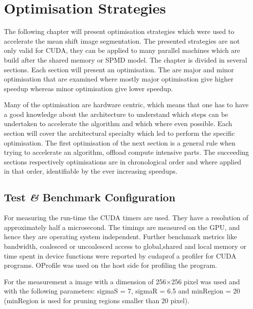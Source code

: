
\chapter{Optimisation Strategies}
\label{ch:optimization}


The following chapter will present optimisation strategies which were used to
accelerate the mean shift image segmentation. The presented strategies are not
only valid for \gls{CUDA}, they can be applied to many parallel machines which
are build after the shared memory or \gls{SPMD} model. The chapter is divided in
several sections. Each section will present an optimisation. The are major and
minor optimisation that are examined where mostly major optimisation give higher
speedup whereas minor optimisation give lower speedup. 

Many of the optimisation are hardware centric, which means that one has to have
a good knowledge about the architecture to understand which steps can be
undertaken to accelerate the algorithm and which where even possible. Each
section will cover the architectural specialty which led to perform the specific
optimisation. The first optimisation of the next section is a general rule when
trying to accelerate an algorithm, offload compute intensive parts. The succeeding
sections respectively optimisations are in chronological order and where applied
in that order, identifiable by the ever increasing speedups. 


\section{Test \textit{\&} Benchmark Configuration} %
\label{sec:test__benchmark_configuration}
For measuring the run-time the \gls{CUDA} timers are used. They have a
resolution of approximately half a microsecond. The timings are measured on the
\gls{GPU}, and hence they are operating system independent. Further benchmark
metrics like bandwidth, coalesced or uncoalesced access to global,shared and
local memory or time spent in device functions were reported by cudaprof a
profiler for \gls{CUDA} programs. OProfile was used on the host side for
profiling the program.

For the measurement a image with a dimension of 256$\times$256 pixel was used
and with the following parameters: \textsf{sigmaS} = 7, \textsf{sigmaR} = 6.5
and \textsf{minRegion} = 20 (\textsf{minRegion} is used for pruning regions
smaller than 20 pixel).


